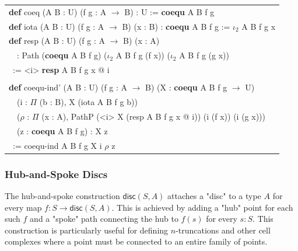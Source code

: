 \documentclass[a4paper,UKenglish,cleveref, autoref, thm-restate]{lipics-v2021}
\newcommand{\tabstyle}[0]{\scriptsize\ttfamily\fontseries{l}\selectfont}
\begin{document}
\begin{table}[ht!]
\tabstyle
\begin{tabular}{l}
\textbf{def} coeq (A B : U) (f g : A $\rightarrow$ B) : U := \textbf{coequ} A B f g \\
\textbf{def} iota (A B : U) (f g : A $\rightarrow$ B) (x : B) : \textbf{coequ} A B f g := $\iota_2$ A B f g x \\
\textbf{def} resp (A B : U) (f g : A $\rightarrow$ B) (x : A) \\
\ \ : Path (\textbf{coequ} A B f g) ($\iota_2$ A B f g (f x)) ($\iota_2$ A B f g (g x)) \\
\ := <i> \textbf{resp} A B f g x @ i \\
\\
\textbf{def} coequ-ind' (A B : U) (f g : A $\rightarrow$ B) (X : \textbf{coequ} A B f g $\rightarrow$ U) \\
\ \ (i : $\Pi$ (b : B), X (iota A B f g b)) \\
\ \ ($\rho$ : $\Pi$ (x : A), PathP (<i> X (resp A B f g x @ i)) (i (f x)) (i (g x))) \\
\ \ (z : \textbf{coequ} A B f g) : X z \\
\ := coequ-ind A B f g X i $\rho$ z

\end{tabular}
\end{table}

\subsubsection*{Hub-and-Spoke Discs}

The hub-and-spoke construction $\mathsf{disc}(S, A)$ attaches a "disc" to a type $A$ for every map $f : S \to \mathsf{disc}(S, A)$. This is achieved by adding a "hub" point for each such $f$ and a "spoke" path connecting the hub to $f(s)$ for every $s : S$. This construction is particularly useful for defining $n$-truncations and other cell complexes where a point must be connected to an entire family of points.
\end{document}
